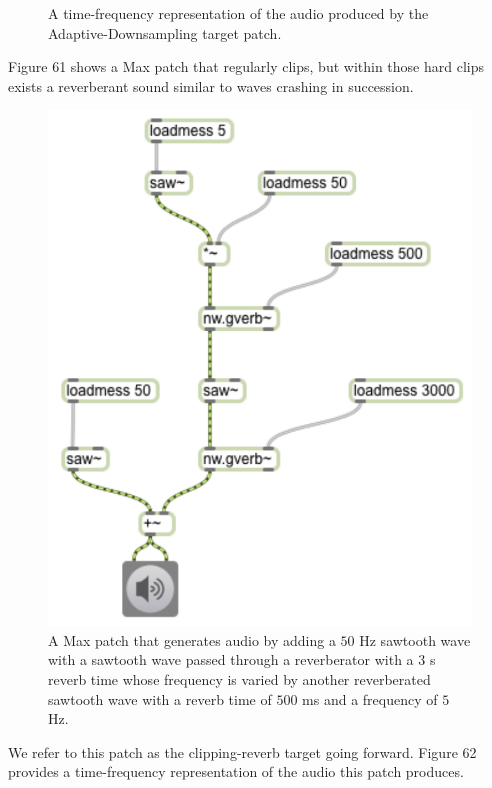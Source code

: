 \documentclass[12pt]{report} 	%
\numberwithin{figure}{chapter}
\numberwithin{table}{chapter}
\numberwithin{equation}{chapter}
\begin{document}
\begin{flushleft}
\begin{figure}[h!]
\begin{center}
\caption[Adaptive downsampling time-frequency representation]{A time-frequency representation of the audio produced by the Adaptive-Downsampling target patch.}
\end{center}
\vspace{6pt}
\end{figure}

Figure 61 shows a Max patch that regularly clips, but within those hard clips exists a reverberant sound similar to waves crashing in succession. 
\begin{figure}[h!]
\begin{center}
\includegraphics[scale=0.8]{ClippingReverbSaw}
\caption[Clipping reverb sawtooth Max patch]{A Max patch that generates audio by adding a $50$ Hz sawtooth wave with a sawtooth wave passed through a reverberator with a $3$ s reverb time whose frequency is varied by another reverberated sawtooth wave with a reverb time of $500$ ms and a frequency of $5$ Hz.}
\end{center}
\vspace{6pt}
\end{figure}
We refer to this patch as the clipping-reverb target going forward. Figure 62 provides a time-frequency representation of the audio this patch produces.


\end{flushleft}
\end{document}
